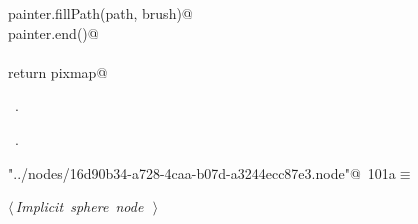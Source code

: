 \documentclass[
    a4paper,      %
    10pt,         %
    openright,    %
    notitlepage,  %
    parskip=half, %
]{scrreprt}       %
\theoremstyle{definition}                    %
\begin{document}
\begin{flushleft}
\begin{minipage}{\linewidth}
\begin{list}{}{}
\mbox{}\lstinline@    painter.fillPath(path, brush)@\\
\mbox{}\lstinline@    painter.end()@\\
\mbox{}\lstinline@@\\
\mbox{}\lstinline@    return pixmap@\\
\mbox{}\lstinline@@{\NWsep}
\end{list}
\vspace{-1.5ex}
\footnotesize
\begin{list}{}{\setlength{\itemsep}{-\parsep}\setlength{\itemindent}{-\leftmargin}}
\item \NWtxtMacroDefBy\ .
\item \NWtxtMacroRefIn\ .

\item{}
\end{list}
\end{minipage}\vspace{4ex}
\end{flushleft}
\begin{flushleft} \small
\begin{minipage}{\linewidth}\label{scrap162}\raggedright\small
{} \verb@"../nodes/16d90b34-a728-4caa-b07d-a3244ecc87e3.node"@\nobreak\ {\footnotesize {101a}}$\equiv$
\vspace{-1ex}
\begin{list}{}{} \item
\mbox{}\lstinline@@\hbox{$\langle\,${\itshape Implicit sphere node}\nobreak\ {\footnotesize {}}$\,\rangle$}\lstinline@@{\NWsep}
\end{list}
\vspace{-1.5ex}
\footnotesize
\begin{list}{}{\setlength{\itemsep}{-\parsep}\setlength{\itemindent}{-\leftmargin}}

\item{}
\end{list}
\end{minipage}\vspace{4ex}
\end{flushleft}
\end{document}

